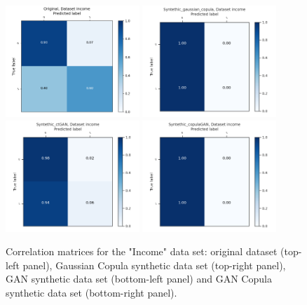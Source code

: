 \documentclass{article}
\begin{document}
\begin{figure}[h!]
	\centering
	\includegraphics[width=0.45\textwidth]{../ConfusionMatrixes/income_Original_.png}
	\includegraphics[width=0.45\textwidth]{../ConfusionMatrixes/income_Syntethic_gaussian_copula_.png}
	\includegraphics[width=0.45\textwidth]{../ConfusionMatrixes/income_Syntethic_ctGAN_.png}
	\includegraphics[width=0.45\textwidth]{../ConfusionMatrixes/income_Syntethic_copulaGAN_.png}

	\caption{Correlation matrices for the "Income" data set: original dataset (top-left panel), Gaussian Copula synthetic data set (top-right panel), GAN synthetic data set (bottom-left panel) and GAN Copula synthetic data set (bottom-right panel).  }
	\label{confusion_income}
\end{figure}
\end{document}
